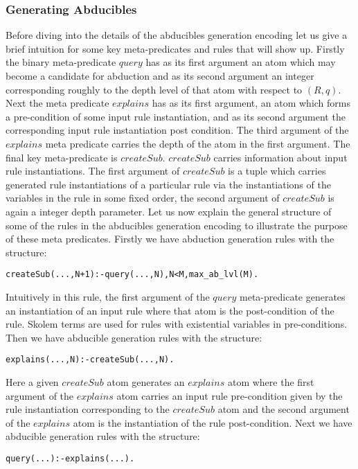 \subsubsection{Generating Abducibles}
Before diving into the details of the abducibles generation encoding let us give a brief intuition for some key meta-predicates and rules that will show up. Firstly the binary meta-predicate $query$ has as its first argument an atom which may become a candidate for abduction and as its second argument an integer corresponding roughly to the depth level of that atom with respect to $(R,q)$. Next the meta predicate $explains$ has as its first argument, an atom which forms a pre-condition of some input rule instantiation, and as its second argument the corresponding input rule instantiation post condition. The third argument of the $explains$ meta predicate carries the depth of the atom in the first argument. The final key meta-predicate is $createSub$. $createSub$ carries information about input rule instantiations. The first argument of $createSub$ is a tuple which carries generated rule instantiations of a particular rule via the instantiations of the variables in the rule in some fixed order, the second argument of $createSub$ is again a integer depth parameter. Let us now explain the general structure of some of the rules in the abducibles generation encoding to illustrate the purpose of these meta predicates. Firstly we have abduction generation rules with the structure:
\begin{lstlisting}[frame=none]
createSub(...,N+1):-query(...,N),N<M,max_ab_lvl(M).
\end{lstlisting}
Intuitively in this rule, the first argument of the $query$ meta-predicate generates an instantiation of an input rule where that atom is the post-condition of the rule. Skolem terms are used for rules with existential variables in pre-conditions. Then we have abducible generation rules with the structure:
\begin{lstlisting}[frame=none]
explains(...,N):-createSub(...,N).
\end{lstlisting}
Here a given $createSub$ atom generates an $explains$ atom where the first argument of the $explains$ atom carries an input rule pre-condition given by the rule instantiation corresponding to the $createSub$ atom and the second argument of the $explains$ atom is the instantiation of the rule post-condition. Next we have abducible generation rules with the structure:
\begin{lstlisting}[frame=none]
query(...):-explains(...).
\end{lstlisting}
